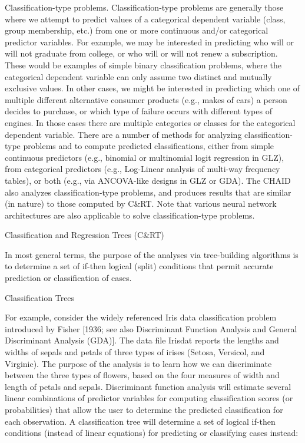 Classification-type problems. Classification-type problems are generally those where we attempt to predict values of a categorical dependent variable (class, group membership, etc.) from one or more continuous and/or categorical predictor variables. For example, we may be interested in predicting who will or will not graduate from college, or who will or will not renew a subscription. These would be examples of simple binary classification problems, where the categorical dependent variable can only assume two distinct and mutually exclusive values. In other cases, we might be interested in predicting which one of multiple different alternative consumer products (e.g., makes of cars) a person decides to purchase, or which type of failure occurs with different types of engines. In those cases there are multiple categories or classes for the categorical dependent variable. There are a number of methods for analyzing classification-type problems and to compute predicted classifications, either from simple continuous predictors (e.g., binomial or multinomial logit regression in GLZ), from categorical predictors (e.g., Log-Linear analysis of multi-way frequency tables), or both (e.g., via ANCOVA-like designs in GLZ or GDA). The CHAID also analyzes classification-type problems, and produces results that are similar (in nature) to those computed by C&RT. Note that various neural network architectures are also applicable to solve classification-type problems.

Classification and Regression Trees (C&RT)

In most general terms, the purpose of the analyses via tree-building algorithms is to determine a set of if-then logical (split) conditions that permit accurate prediction or classification of cases.

Classification Trees

For example, consider the widely referenced Iris data classification problem introduced by Fisher [1936; see also Discriminant Function Analysis and General Discriminant Analysis (GDA)]. The data file Irisdat reports the lengths and widths of sepals and petals of three types of irises (Setosa, Versicol, and Virginic). The purpose of the analysis is to learn how we can discriminate between the three types of flowers, based on the four measures of width and length of petals and sepals. Discriminant function analysis will estimate several linear combinations of predictor variables for computing classification scores (or probabilities) that allow the user to determine the predicted classification for each observation. A classification tree will determine a set of logical if-then conditions (instead of linear equations) for predicting or classifying cases instead:



